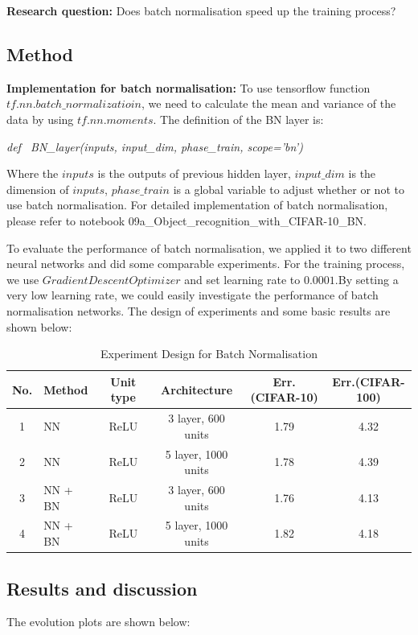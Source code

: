 \documentclass[]{article}
\begin{document}
\textbf{Research question:} Does batch normalisation speed up the training process?

\subsection{Method}
\textbf{Implementation for batch normalisation:} To use tensorflow function $tf.nn.batch\_normalizatioin$, we need to calculate the mean and variance of the data by using $tf.nn.moments$. The definition of the BN layer is:

\emph{def \ BN\_layer(inputs, input\_dim, phase\_train, scope='bn')}

Where the $inputs$ is the outputs of previous hidden layer, $input\_dim$ is the dimension of $inputs$, $phase\_train$ is a global variable to adjust whether or not to use batch normalisation. For detailed implementation of batch normalisation, please refer to notebook 09a\_Object\_recognition\_with\_CIFAR-10\_BN.

To evaluate the performance of batch normalisation, we applied it to two different neural networks and did some comparable experiments. For the training process, we use $GradientDescentOptimizer$ and set learning rate to $0.0001$.By setting a very low learning rate, we could easily investigate the performance of batch normalisation networks. The design of experiments and some basic results are shown below:

\begin{table}[!ht]
\centering 
\caption{Experiment Design for Batch Normalisation}
\begin{tabular}{c l c c c c }
\toprule
No. & Method & Unit type & Architecture & Err.(CIFAR-10) & Err.(CIFAR-100)  \\
\midrule
1 & NN & ReLU & 3 layer, 600 units & 1.79 & 4.32 \\
2 & NN & ReLU & 5 layer, 1000 units & 1.78 & 4.39   \\
3 & NN + BN & ReLU & 3 layer, 600 units & 1.76 & 4.13   \\
4 & NN + BN & ReLU & 5 layer, 1000 units & 1.82 & 4.18   \\
\bottomrule
\end{tabular}
\end{table}

\subsection{Results and discussion}
The evolution plots are shown below:
\end{document}
